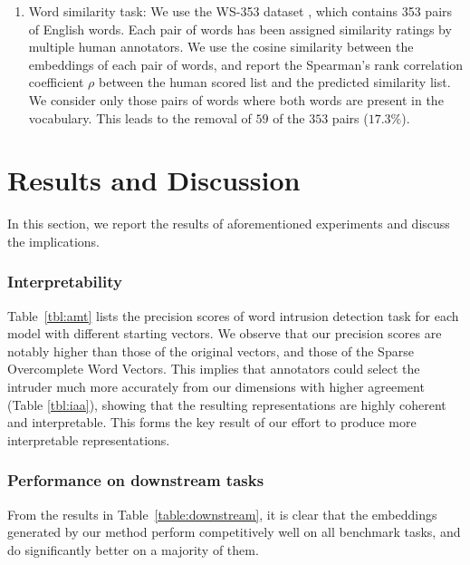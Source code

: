 \documentclass[letterpaper]{article} %
\begin{document}
\begin{enumerate}
\item Word similarity task: We use the WS-353 dataset \cite{finkelstein2001placing}, which contains 353 pairs of English words. Each pair of words has been assigned similarity ratings by multiple human annotators. We use the cosine similarity between the embeddings of each pair of words, and report the Spearman's rank correlation coefficient $\rho$ between the human scored list and the predicted similarity list. We consider only those pairs of words where both words are present in the vocabulary. This leads to the removal of $59$ of the $353$ pairs ($17.3\%$).

\end{enumerate}



\section{Results and Discussion}
In this section, we report the results of aforementioned experiments and discuss the implications.

\subsubsection{Interpretability}
Table~\ref{tbl:amt} lists the precision scores of word intrusion detection task for each model with different starting vectors. We observe that our precision scores are notably higher than those of the original vectors, and those of the Sparse Overcomplete Word Vectors. This implies that annotators could select the intruder much more accurately from our dimensions with higher agreement (Table \ref{tbl:iaa}), showing that the resulting representations are highly coherent and interpretable. This forms the key result of our effort to produce more interpretable representations. 
\subsubsection{Performance on downstream tasks}
From the results in Table~\ref{table:downstream}, it is clear that the embeddings generated by our method perform competitively well on all benchmark tasks, and do significantly better on a majority of them.
\end{document}
